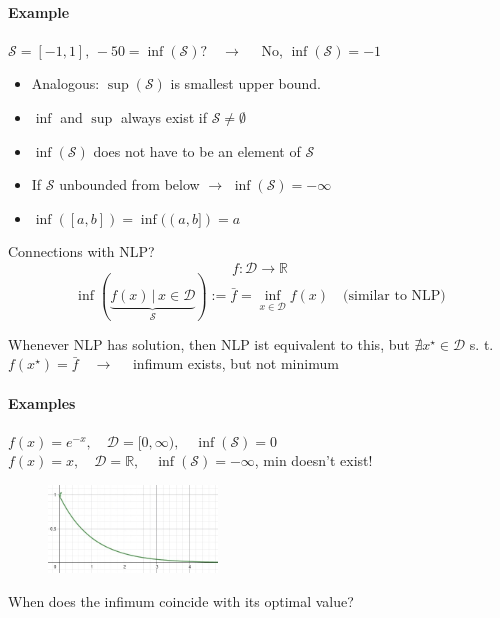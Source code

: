 \documentclass[12pt,a4paper,oneside]{scrartcl}
\begin{document}
	\paragraph{Example}
		$\mathcal{S} = [-1,1], \, -50 = \inf(\mathcal{S})?\quad\rightarrow\quad$ No, $\inf(\mathcal{S}) = -1$	
	\begin{itemize}
		\item Analogous: $\sup(\mathcal{S})$ is smallest upper bound.  
		\item $\inf$ and $\sup$ always exist if $\mathcal{S} \neq \emptyset$
		\item $\inf(\mathcal{S})$ does not have to be an element of $\mathcal{S}$
		\item If $\mathcal{S}$ unbounded from below $\rightarrow$ $\inf(\mathcal{S})=-\infty$
		\item $\inf([a,b]) = \inf((a,b]) = a$
	\end{itemize}
	
	Connections with NLP?
	\[
	f: \mathcal{D} \to \mathbb{R}
	\]
	\[
	\inf(\underset{\mathcal{S}}{\underbrace{f(x)\,|\,x\in\mathcal{D}}}):=\bar{f}=\underset{x\in\mathcal{D}}{\inf}f(x) \quad\text{(similar to NLP)}
	\]
	
	Whenever NLP has solution, then NLP ist equivalent to this, but $\nexists x^\star \in \mathcal{D}$ s. t. $f(x^\star) = \bar{f}\quad\rightarrow\quad$ infimum exists, but not minimum
	
	\paragraph{Examples}
		$f(x) = e^{-x}, \quad \mathcal{D} = [0,\infty), \quad \inf(\mathcal{S}) = 0$ \\
		$f(x) = x, \quad \mathcal{D} =\mathbb{R}, \quad \inf(\mathcal{S}) = - \infty$, min doesn't exist! 
	\begin{figure}[H]
		\begin{center}
			\includegraphics[width=0.4\textwidth]{images/1.0-1.jpg}
		\end{center}
	\end{figure}
		
	When does the infimum coincide with its optimal value?
	
\end{document}
